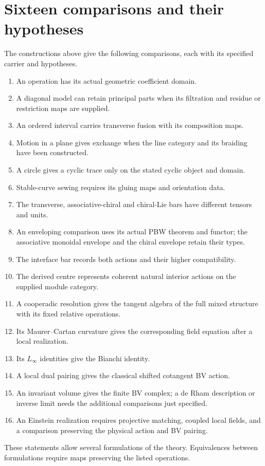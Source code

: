 \section{Sixteen comparisons and their hypotheses}
The constructions above give the following comparisons, each with its
specified carrier and hypotheses.
\begin{enumerate}
\item An operation has its actual geometric coefficient domain.
\item A diagonal model can retain principal parts when its filtration and
      residue or restriction maps are supplied.
\item An ordered interval carries transverse fusion with its composition maps.
\item Motion in a plane gives exchange when the line category and its braiding
      have been constructed.
\item A circle gives a cyclic trace only on the stated cyclic object and domain.
\item Stable-curve sewing requires its gluing maps and orientation data.
\item The transverse, associative-chiral and chiral-Lie bars have different
      tensors and units.
\item An enveloping comparison uses its actual PBW theorem and functor; the
      associative monoidal envelope and the chiral envelope retain their types.
\item The interface bar records both actions and their higher compatibility.
\item The derived centre represents coherent natural interior actions on
      the supplied module category.
\item A cooperadic resolution gives the tangent algebra of the full mixed
      structure with its fixed relative operations.
\item Its Maurer--Cartan curvature gives the corresponding field equation
      after a local realization.
\item Its $L_\infty$ identities give the Bianchi identity.
\item A local dual pairing gives the classical shifted cotangent BV action.
\item An invariant volume gives the finite BV complex; a de Rham description
      or inverse limit needs the additional comparisons just specified.
\item An Einstein realization requires projective matching, coupled local
      fields, and a comparison preserving the physical action and BV pairing.
\end{enumerate}
These statements allow several formulations of the theory. Equivalences
between formulations require maps preserving the listed operations.

